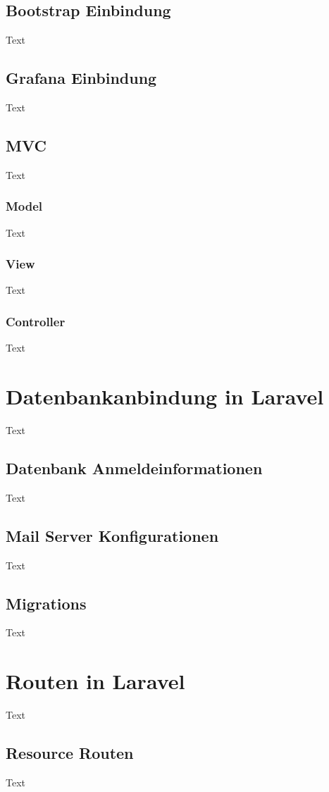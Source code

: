 \subsection{Bootstrap Einbindung}
Text
\subsection{Grafana Einbindung}
Text

\subsection{MVC}
Text
\subsubsection{Model}
Text
\subsubsection{View}
Text
\subsubsection{Controller}
Text


\section{Datenbankanbindung in Laravel}
Text

\subsection{Datenbank Anmeldeinformationen}
Text

\subsection{Mail Server Konfigurationen}
Text

\subsection{Migrations}
Text


\section{Routen in Laravel}
Text

\subsection{Resource Routen}
Text

